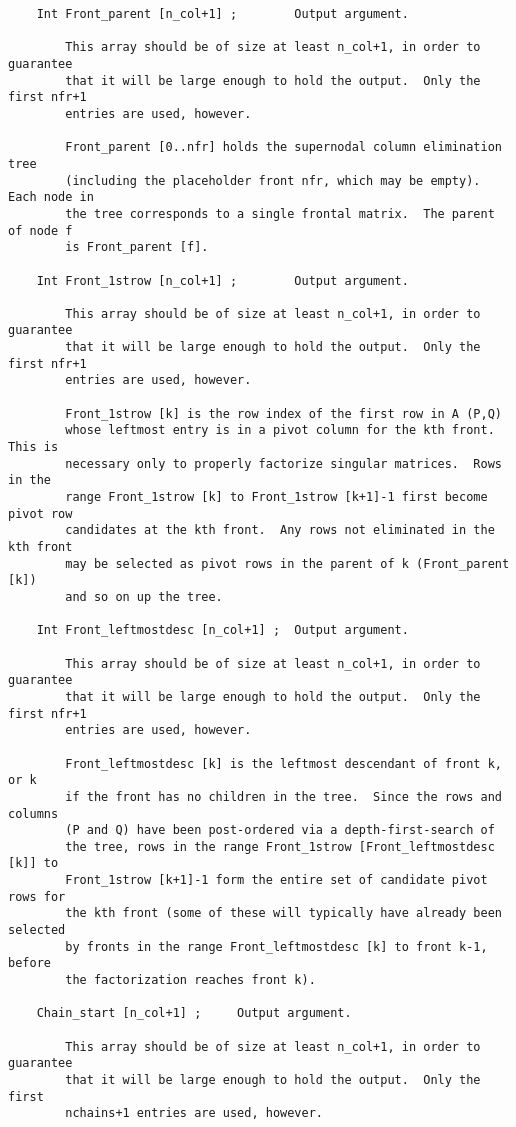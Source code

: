 \documentclass[11pt]{article}
\begin{document}
{\begin{verbatim}
    Int Front_parent [n_col+1] ;        Output argument.

        This array should be of size at least n_col+1, in order to guarantee
        that it will be large enough to hold the output.  Only the first nfr+1
        entries are used, however.

        Front_parent [0..nfr] holds the supernodal column elimination tree
        (including the placeholder front nfr, which may be empty).  Each node in
        the tree corresponds to a single frontal matrix.  The parent of node f
        is Front_parent [f].

    Int Front_1strow [n_col+1] ;        Output argument.

        This array should be of size at least n_col+1, in order to guarantee
        that it will be large enough to hold the output.  Only the first nfr+1
        entries are used, however.

        Front_1strow [k] is the row index of the first row in A (P,Q)
        whose leftmost entry is in a pivot column for the kth front.  This is
        necessary only to properly factorize singular matrices.  Rows in the
        range Front_1strow [k] to Front_1strow [k+1]-1 first become pivot row
        candidates at the kth front.  Any rows not eliminated in the kth front
        may be selected as pivot rows in the parent of k (Front_parent [k])
        and so on up the tree.

    Int Front_leftmostdesc [n_col+1] ;  Output argument.

        This array should be of size at least n_col+1, in order to guarantee
        that it will be large enough to hold the output.  Only the first nfr+1
        entries are used, however.

        Front_leftmostdesc [k] is the leftmost descendant of front k, or k
        if the front has no children in the tree.  Since the rows and columns
        (P and Q) have been post-ordered via a depth-first-search of
        the tree, rows in the range Front_1strow [Front_leftmostdesc [k]] to
        Front_1strow [k+1]-1 form the entire set of candidate pivot rows for
        the kth front (some of these will typically have already been selected
        by fronts in the range Front_leftmostdesc [k] to front k-1, before
        the factorization reaches front k).

    Chain_start [n_col+1] ;     Output argument.

        This array should be of size at least n_col+1, in order to guarantee
        that it will be large enough to hold the output.  Only the first
        nchains+1 entries are used, however.


\end{verbatim}}
\end{document}
